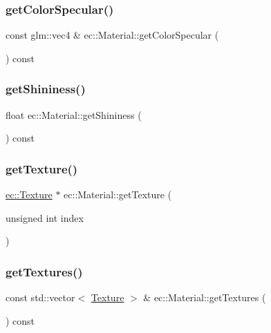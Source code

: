 \subsubsection{\texorpdfstring{get\+Color\+Specular()}{getColorSpecular()}}
{\footnotesize\ttfamily const glm\+::vec4 \& ec\+::\+Material\+::get\+Color\+Specular (\begin{DoxyParamCaption}{ }\end{DoxyParamCaption}) const}

\mbox{\label{classec_1_1_material_a125ba490c4191f8f6fe77e76934ed33a}} 
\subsubsection{\texorpdfstring{get\+Shininess()}{getShininess()}}
{\footnotesize\ttfamily float ec\+::\+Material\+::get\+Shininess (\begin{DoxyParamCaption}{ }\end{DoxyParamCaption}) const}

\mbox{\label{classec_1_1_material_a8679615f24284e809f213b882bec81bf}} 
\subsubsection{\texorpdfstring{get\+Texture()}{getTexture()}}
{\footnotesize\ttfamily \mbox{\hyperlink{classec_1_1_texture}{ec\+::\+Texture}} $\ast$ ec\+::\+Material\+::get\+Texture (\begin{DoxyParamCaption}\item[{unsigned int}]{index }\end{DoxyParamCaption})}

\mbox{\label{classec_1_1_material_a95d74f12ec9d69a764a249e36b6b857c}} 
\subsubsection{\texorpdfstring{get\+Textures()}{getTextures()}}
{\footnotesize\ttfamily const std\+::vector$<$ \mbox{\hyperlink{classec_1_1_texture}{Texture}} $>$ \& ec\+::\+Material\+::get\+Textures (\begin{DoxyParamCaption}{ }\end{DoxyParamCaption}) const}


